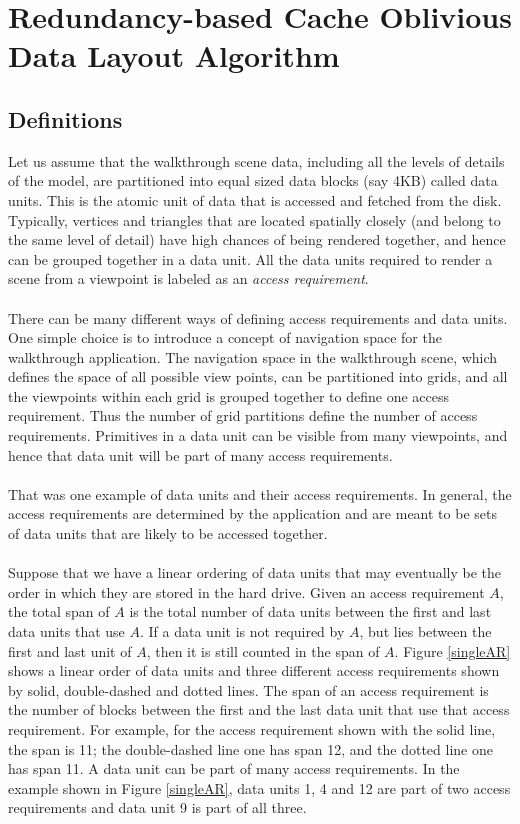 
\section{Redundancy-based Cache Oblivious Data Layout Algorithm}


\subsection{Definitions}

Let us assume that the walkthrough scene data, including all the levels of
details of the model, are partitioned into equal sized data blocks (say 4KB)
called data units. This is the atomic unit of data that is accessed and fetched
from the disk. Typically, vertices and triangles that are located spatially
closely (and belong to the same level of detail) have high chances of being
rendered together, and hence can be grouped together in a data unit. All the
data units required to render a scene from a viewpoint is labeled as an {\em
access requirement}. \\
\\
There can be many different ways of defining access requirements and data
units. One simple choice is to introduce a concept of navigation space for the
walkthrough application.
The navigation space in the walkthrough scene, which defines the space of all
possible view points, can be partitioned into grids,  and all the viewpoints
within each grid is grouped together to define one access requirement. Thus the
number of grid partitions define the number of access requirements. Primitives
in a data unit can be visible from many viewpoints, and hence that data unit
will be part of many access requirements. \\
\\
That was one example of data units and their access requirements. In general,
the access requirements are determined by the application and are meant to be
sets of data units that are likely to be accessed together. \\
\\
Suppose that we have a linear ordering of data units that may eventually be the
order in which they are stored in the hard drive.  Given an access requirement
$A$, the total span of $A$ is the total number of data units between the first
and last data units that use $A$. If a data unit is not required by $A$, but
lies between the first and last unit of $A$, then it is still counted in the
span of $A$. Figure \ref{singleAR} shows a linear order of data units and three
different access requirements shown by solid, double-dashed and dotted lines.
The span of an access requirement is the number of blocks between the first and
the last data unit that use that access requirement. For example, for the
access requirement shown with the solid line, the span is 11; the double-dashed
line one has span 12, and the dotted line one has span 11. A data unit can be
part of many access requirements. In the example shown in Figure \ref{singleAR}, data units
1, 4 and 12 are part of two access requirements and data unit 9 is part of all
three. \\ \\

